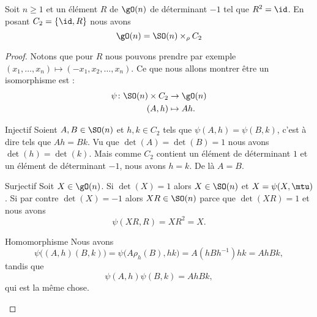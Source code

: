 \begin{proposition}      \label{PROPooDHYWooXxEXvl}
    Soit \( n\geq 1\) et un élément \( R\) de \( \gO(n)\) de déterminant \( -1\) tel que \( R^2=\id\). En posant \( C_2=\{ \id,R \}\) nous avons
    \begin{equation}
        \gO(n)=\SO(n)\times_{\rho} C_2
    \end{equation}
\end{proposition}

\begin{proof}
    Notons que pour \( R\) nous pouvons prendre par exemple \( (x_1,\ldots, x_n)\mapsto (-x_1,x_2,\ldots, x_n)\). Ce que nous allons montrer être un isomorphisme est :
    \begin{equation}
        \begin{aligned}
            \psi\colon \SO(n)\times C_2&\to \gO(n) \\
            (A,h)&\mapsto Ah. 
        \end{aligned}
    \end{equation}
    \begin{subproof}
        \item[Injectif]
            Soient \( A,B\in \SO(n)\) et \( h,k\in C_2\) tels que \( \psi(A,h)=\psi(B,k)\), c'est à dire tels que \( Ah=Bk\). Vu que \( \det(A)=\det(B)=1\) nous avons \( \det(h)=\det(k)\). Mais comme \( C_2\) contient un élément de déterminant \( 1\) et un élément de déterminant \( -1\), nous avons \( h=k\). De là \( A=B\).
        \item[Surjectif]
            Soit \( X\in\gO(n)\). Si \( \det(X)=1\) alors \( X\in \SO(n)\) et \( X=\psi(X,\mtu)\). Si par contre \( \det(X)=-1\) alors \( XR\in\SO(n)\) parce que \( \det(XR)=1\) et nous avons
            \begin{equation}
                \psi(XR,R)=XR^2=X.
            \end{equation}
        \item[Homomorphisme]
            Nous avons
            \begin{equation}
                \psi\Big( (A,h)(B,k) \Big)=\psi\big( A\rho_h(B),hk \big)=A(hBh^{-1})hk=AhBk,
            \end{equation}
            tandis que
            \begin{equation}
                \psi(A,h)\psi(B,k)=AhBk,
            \end{equation}
            qui est la même chose.
    \end{subproof}
\end{proof}

